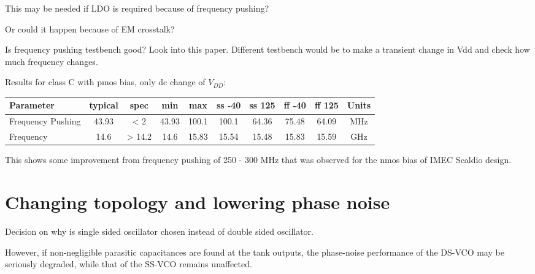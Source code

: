 \documentclass{article}
\begin{document}
\begin{question}
	This may be needed if LDO is required because of frequency pushing?
\end{question}

\begin{question}
	Or could it happen because of EM crosstalk?
\end{question}


Is frequency pushing testbench good? Look into this paper. %
Different testbench would be to make a transient change in Vdd and check how much frequency changes.


Results for class C with pmos bias, only dc change of $V_{DD}$:

\begin{center}
	\begin{tabular}{|l|c|c|c|c|c|c|c|c|c|}
		\hline
		Parameter & typical & spec  & min & max & ss -40 & ss 125 & ff -40 & ff 125 & Units \\
		\hline
		Frequency Pushing & 43.93 & < 2 &  43.93 & 100.1 & 100.1 & 64.36 & 75.48 & 64.09 & MHz \\ 
		\hline
		Frequency  & 14.6 & > 14.2  & 14.6 & 15.83 & 15.54 & 15.48 & 15.83 & 15.59 & GHz  \\ 
		\hline
	\end{tabular}
\end{center}

This shows some improvement from frequency pushing of 250 - 300 MHz that was observed for the nmos bias of IMEC Scaldio design.

\section{Changing topology and lowering phase noise}

Decision on why is single sided oscillator chosen instead of double sided oscillator.

\begin{info}
However, if non-negligible parasitic capacitances are found at the tank outputs, the phase-noise performance of the DS-VCO may be seriously degraded, while that of the SS-VCO remains unaffected.
\end{info}
\end{document}
